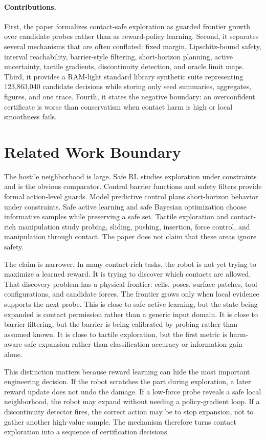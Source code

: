 \documentclass{article}
\begin{document}
\paragraph{Contributions.}
First, the paper formalizes contact-safe exploration as guarded frontier growth
over candidate probes rather than as reward-policy learning. Second, it
separates several mechanisms that are often conflated: fixed margin,
Lipschitz-bound safety, interval reachability, barrier-style filtering,
short-horizon planning, active uncertainty, tactile gradients, discontinuity
detection, and oracle limit maps. Third, it provides a RAM-light standard
library synthetic suite representing 123,863,040 candidate decisions while
storing only seed summaries, aggregates, figures, and one trace. Fourth, it
states the negative boundary: an overconfident certificate is worse than
conservatism when contact harm is high or local smoothness fails.

\section{Related Work Boundary}

The hostile neighborhood is large. Safe RL studies exploration under
constraints and is the obvious comparator. Control barrier functions and
safety filters provide formal action-level guards. Model predictive control
plans short-horizon behavior under constraints. Safe active learning and safe
Bayesian optimization choose informative samples while preserving a safe set.
Tactile exploration and contact-rich manipulation study probing, sliding,
pushing, insertion, force control, and manipulation through contact. The paper
does not claim that these areas ignore safety.

The claim is narrower. In many contact-rich tasks, the robot is not yet trying
to maximize a learned reward. It is trying to discover which contacts are
allowed. That discovery problem has a physical frontier: cells, poses, surface
patches, tool configurations, and candidate forces. The frontier grows only
when local evidence supports the next probe. This is close to safe active
learning, but the state being expanded is contact permission rather than a
generic input domain. It is close to barrier filtering, but the barrier is
being calibrated by probing rather than assumed known. It is close to tactile
exploration, but the first metric is harm-aware safe expansion rather than
classification accuracy or information gain alone.

This distinction matters because reward learning can hide the most important
engineering decision. If the robot scratches the part during exploration, a
later reward update does not undo the damage. If a low-force probe reveals a
safe local neighborhood, the robot may expand without needing a policy-gradient
loop. If a discontinuity detector fires, the correct action may be to stop
expansion, not to gather another high-value sample. The mechanism therefore
turns contact exploration into a sequence of certification decisions.
\end{document}
